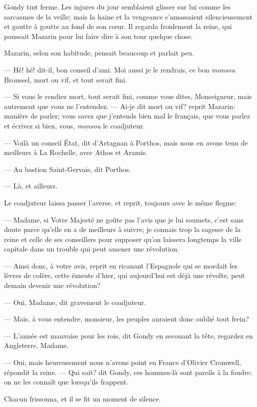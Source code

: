 Gondy tint ferme. Les injures du jour semblaient glisser sur lui comme les sarcasmes de la veille; mais la haine et la vengeance s'amassaient silencieusement et goutte à goutte au fond de son cœur. Il regarda froidement la reine, qui poussait Mazarin pour lui faire dire à son tour quelque chose.

Mazarin, selon son habitude, pensait beaucoup et parlait peu.

— Hé! hé! dit-il, bon conseil d'ami. Moi aussi je le rendrais, ce bon \textit{monsou} Broussel, mort ou vif, et tout serait fini.

— Si vous le rendiez mort, tout serait fini, comme vous dites, Monseigneur, mais autrement que vous ne l'entendez.
— Ai-je dit mort ou vif? reprit Mazarin: manière de parler; vous savez que j'entends bien mal le français, que vous parlez et écrivez si bien, vous, \textit{monsou} le coadjuteur.

— Voilà un conseil État, dit d'Artagnan à Porthos, mais nous en avons tenu de meilleurs à La Rochelle, avec Athos et Aramis.

— Au bastion Saint-Gervais, dit Porthos.

— Là, et ailleurs.

Le coadjuteur laissa passer l'averse, et reprit, toujours avec le même flegme:

— Madame, si Votre Majesté ne goûte pas l'avis que je lui soumets, c'est sans doute parce qu'elle en a de meilleurs à suivre; je connais trop la sagesse de la reine et celle de ses conseillers pour supposer qu'on laissera longtemps la ville capitale dans un trouble qui peut amener une révolution.

— Ainsi donc, à votre avis, reprit en ricanant l'Espagnole qui se mordait les lèvres de colère, cette émeute d'hier, qui aujourd'hui est déjà une révolte, peut demain devenir une révolution?

— Oui, Madame, dit gravement le coadjuteur.

— Mais, à vous entendre, monsieur, les peuples auraient donc oublié tout frein?

— L'année est mauvaise pour les rois, dit Gondy en secouant la tête, regardez en Angleterre, Madame.

— Oui, mais heureusement nous n'avons point en France d'Olivier Cromwell, répondit la reine.
— Qui sait? dit Gondy, ces hommes-là sont pareils à la foudre: on ne les connaît que lorsqu'ils frappent.

Chacun frissonna, et il se fit un moment de silence.

